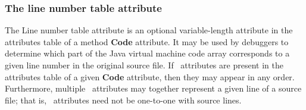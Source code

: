 \subsubsection{The line number table attribute}\label{lineNumTab}

The Line number table attribute is an optional variable-length attribute in the attributes table of a method \textbf{Code} attribute. 
It may be used by debuggers to determine which part of the Java virtual machine code array corresponds to a given line number in the original source file.
 If \lineNumberTable \ attributes are present in the attributes table of a given \textbf{Code} attribute, then they may appear in any order.
 Furthermore, multiple \lineNumberTable \ attributes may together represent a given line of a source file;
 that is, \lineNumberTable \  attributes need not be one-to-one with source lines.


